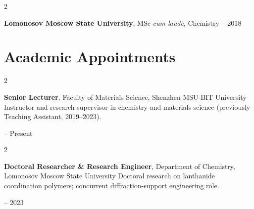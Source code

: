 \documentclass[10pt, letterpaper]{article}
\newenvironment{twocolentry}[2][]{
    \onecolentry
    \def\secondColumn{#2}
    \setcolumnwidth{\fill, 4.5 cm}
    \begin{paracol}{2}
}{
    \switchcolumn \raggedleft \secondColumn
    \end{paracol}
    \endonecolentry
} %
\begin{document}
        \vspace{0.03 cm}

        \begin{twocolentry}{
            2012 – 2018
        }
            \textbf{Lomonosov Moscow State University}, MSc \textit{cum laude}, Chemistry \end{twocolentry}
        \vspace{0.04 cm}

    \section{Academic Appointments}
        \begin{twocolentry}{
            2023 – Present
        }
            \textbf{Senior Lecturer}, Faculty of Materials Science, Shenzhen MSU-BIT University\newline
            {\small Instructor and research supervisor in chemistry and materials science (previously Teaching Assistant, 2019–2023).}
            \end{twocolentry}

        \vspace{0.03 cm}

        \begin{twocolentry}{
            2018 – 2023
        }
            \textbf{Doctoral Researcher \& Research Engineer}, Department of Chemistry, Lomonosov Moscow State University\newline
            {\small Doctoral research on lanthanide coordination polymers; concurrent diffraction-support engineering role.}
            \end{twocolentry}
        \vspace{0.04 cm}
\end{document}
